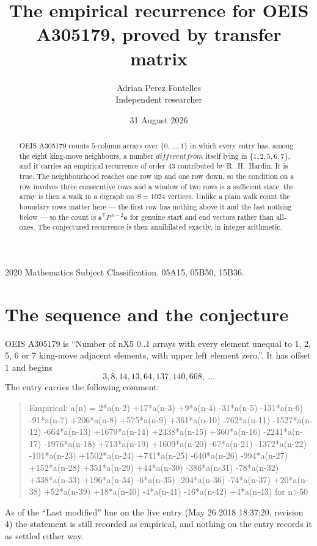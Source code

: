 \documentclass[11pt,a4paper]{article}
\title{The empirical recurrence for OEIS A305179, proved by transfer matrix}
\author{Adrian Perez Fontelles\\ \small Independent researcher}
\date{31 August 2026}
\theoremstyle{plain}
\theoremstyle{definition}
\begin{document}
\maketitle

\begin{abstract}
OEIS A305179 counts $5$-column arrays over $\{0,\dots,1\}$ in which every entry has,
among the eight king-move neighbours, a number $different from$ itself lying in $\{1,2,5,6,7\}$, and it carries an empirical
recurrence of order $43$ contributed by R.~H.~Hardin. It is true. The neighbourhood
reaches one row up and one row down, so the condition on a row involves three consecutive
rows and a window of two rows is a sufficient state; the array is then a walk in a digraph
on $S=1024$ vertices. Unlike a plain walk count the boundary rows matter here --- the first
row has nothing above it and the last nothing below --- so the count is
$\mathbf{s}^{\!\top}P^{\,n-2}\mathbf{e}$ for genuine start and end vectors rather than
all-ones. The conjectured recurrence is then annihilated exactly, in integer arithmetic.
\end{abstract}

\noindent\small 2020 Mathematics Subject Classification. 05A15, 05B50, 15B36.\normalsize

\section{The sequence and the conjecture}

OEIS A305179 is ``Number of nX5 0..1 arrays with every element unequal to 1, 2, 5, 6 or 7 king-move adjacent elements, with upper left element zero.''. It has offset
$1$ and begins
\[
3, 8, 14, 13, 64, 137, 140, 668,\ \dots
\]
The entry carries the following comment:
\begin{quote}\small
Empirical: a(n) = 2*a(n-2) +17*a(n-3) +9*a(n-4) -31*a(n-5) -131*a(n-6) -91*a(n-7) +206*a(n-8) +575*a(n-9) +361*a(n-10) -762*a(n-11) -1527*a(n-12) -664*a(n-13) +1679*a(n-14) +2438*a(n-15) +360*a(n-16) -2241*a(n-17) -1976*a(n-18) +713*a(n-19) +1609*a(n-20) -67*a(n-21) -1372*a(n-22) -101*a(n-23) +1502*a(n-24) +741*a(n-25) -640*a(n-26) -994*a(n-27) +152*a(n-28) +351*a(n-29) +44*a(n-30) -386*a(n-31) -78*a(n-32) +338*a(n-33) +196*a(n-34) -6*a(n-35) -204*a(n-36) -74*a(n-37) +20*a(n-38) +52*a(n-39) +18*a(n-40) -4*a(n-41) -16*a(n-42) +4*a(n-43) for n>50
\end{quote}
As of the ``Last modified'' line on the live entry (May 26 2018 18:37:20, revision
4) the statement is still recorded as empirical, and nothing on the entry
records it as settled either way.
\end{document}
